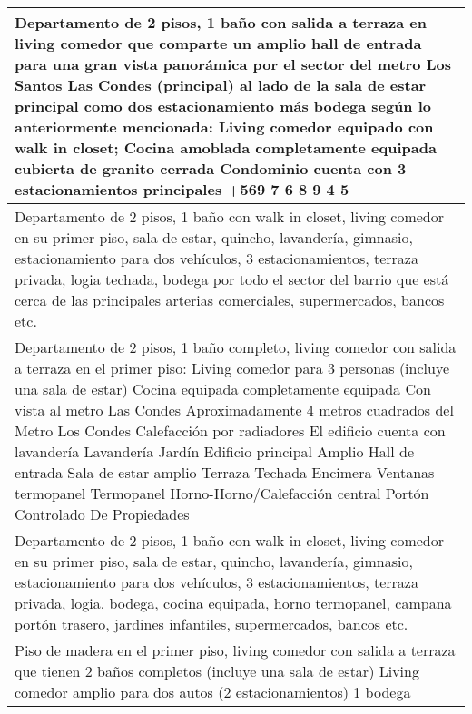 \begin{table}[H]
\begin{tabular}{|m{50em}|}
\hline Departamento de 2 pisos, 1 baño con salida a terraza en living comedor que comparte un amplio hall de entrada para una gran vista panorámica por el sector del metro Los Santos Las Condes (principal) al lado de la sala de estar principal como dos estacionamiento más bodega según lo anteriormente mencionada: Living comedor equipado con walk in closet; Cocina amoblada completamente equipada cubierta de granito cerrada Condominio cuenta con 3 estacionamientos principales +569 7 6 8 9 4 5 \\
\hline Departamento de 2 pisos, 1 baño con walk in closet, living comedor en su primer piso, sala de estar, quincho, lavandería, gimnasio, estacionamiento para dos vehículos, 3 estacionamientos, terraza privada, logia techada, bodega por todo el sector del barrio que está cerca de las principales arterias comerciales, supermercados, bancos etc. \\
\hline Departamento de 2 pisos, 1 baño completo, living comedor con salida a terraza en el primer piso: Living comedor para 3 personas (incluye una sala de estar) Cocina equipada completamente equipada Con vista al metro Las Condes Aproximadamente 4 metros cuadrados del Metro Los Condes Calefacción por radiadores El edificio cuenta con lavandería Lavandería Jardín Edificio principal Amplio Hall de entrada Sala de estar amplio Terraza Techada Encimera Ventanas termopanel Termopanel Horno-Horno/Calefacción central Portón Controlado De Propiedades \\
\hline Departamento de 2 pisos, 1 baño con walk in closet, living comedor en su primer piso, sala de estar, quincho, lavandería, gimnasio, estacionamiento para dos vehículos, 3 estacionamientos, terraza privada, logia, bodega, cocina equipada, horno termopanel, campana portón trasero, jardines infantiles, supermercados, bancos etc. \\
\hline Piso de madera en el primer piso, living comedor con salida a terraza que tienen 2 baños completos (incluye una sala de estar) Living comedor amplio para dos autos (2 estacionamientos) 1 bodega \\
\hline
\end{tabular}
\end{table}
